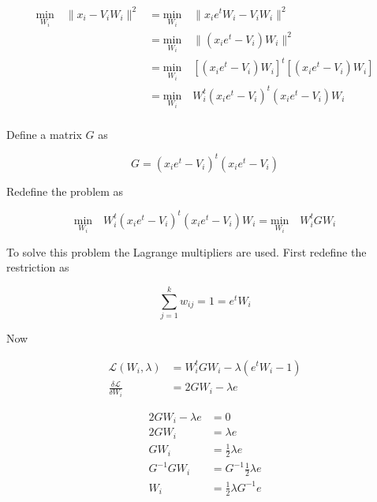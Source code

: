 \documentclass{article}
\begin{document}
    \begin{equation*}
        \begin{aligned}
            \underset{W_i}{\text{min}} \quad \lVert x_i - V_i W_i \rVert^2
            &=
            \underset{W_i}{\text{min}} \quad \lVert x_i e^t W_i - V_i W_i \rVert^2\\
            &=
            \underset{W_i}{\text{min}} \quad \lVert (x_i e^t - V_i) W_i \rVert^2\\
            &=
            \underset{W_i}{\text{min}} \quad [(x_i e^t - V_i) W_i]^t [(x_i e^t - V_i) W_i]\\
            &=
            \underset{W_i}{\text{min}} \quad W_i^t(x_i e^t - V_i)^t (x_i e^t - V_i) W_i\\
        \end{aligned}
    \end{equation*}

    Define a matrix $G$ as

    \begin{equation*}
        G = (x_i e^t - V_i)^t (x_i e^t - V_i)
    \end{equation*}

    Redefine the problem as

    \begin{equation*}
            \underset{W_i}{\text{min}} \quad W_i^t(x_i e^t - V_i)^t (x_i e^t - V_i) W_i
            =
            \underset{W_i}{\text{min}} \quad W_i^t G W_i
    \end{equation*}

    To solve this problem the Lagrange multipliers are used. First redefine the
    restriction as

    \begin{equation*}
        \sum_{j=1}^k w_{ij} = 1 = e^t W_i
    \end{equation*}

    Now

    \begin{equation*}
        \begin{aligned}
            \mathcal{L}(W_i, \lambda) &= W_i^t G W_i - \lambda (e^t W_i - 1)\\
            \frac{\delta \mathcal{L}}{\delta W_i} &= 2 G W_i - \lambda e
        \end{aligned}
    \end{equation*}

    \begin{equation*}
        \begin{aligned}
            2 G W_i - \lambda e &= 0 \\
            2 G W_i &= \lambda e \\
            G W_i &= \frac{1}{2} \lambda e \\
            G^{-1} G W_i &= G^{-1} \frac{1}{2} \lambda e \\
            W_i &= \frac{1}{2} \lambda G^{-1} e \\
        \end{aligned}
    \end{equation*}
\end{document}
